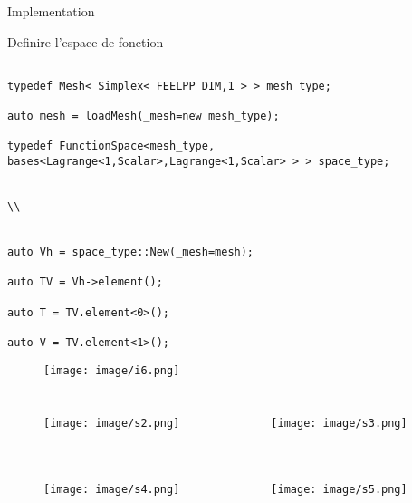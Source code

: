 \documentclass[11pt]{beamer}
\begin{document}
\begin{frame}{Implementation}
\begin{block}{Definire l'espace de fonction}

\begin{verbatim}

typedef Mesh< Simplex< FEELPP_DIM,1 > > mesh_type;

auto mesh = loadMesh(_mesh=new mesh_type);

typedef FunctionSpace<mesh_type, bases<Lagrange<1,Scalar>,Lagrange<1,Scalar> > > space_type;


\\


auto Vh = space_type::New(_mesh=mesh);
    
auto TV = Vh->element();

auto T = TV.element<0>();

auto V = TV.element<1>();
\end{verbatim}
\end{block}


\begin{figure}
\texttt{[image: image/i6.png]}
\end{figure}

\end{frame}


\begin{frame}
\begin{columns}
\begin{figure}
\texttt{[image: image/s2.png]}
\end{figure}
\begin{figure}
\texttt{[image: image/s3.png]}
\end{figure}
\end{columns}
\end{frame}


\begin{frame}
\begin{columns}
\begin{figure}
\texttt{[image: image/s4.png]}
\end{figure}
\begin{figure}
\texttt{[image: image/s5.png]}
\end{figure}
\end{columns}
\end{frame}
\end{document}
